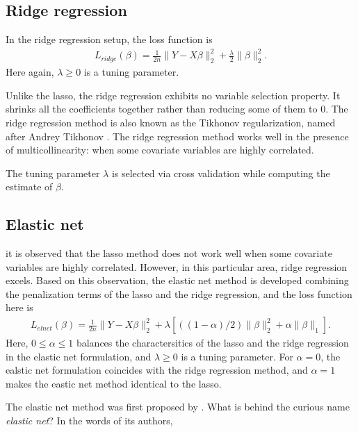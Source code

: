 \documentclass[
]{book}
\begin{document}
\hypertarget{ridge-description}{%
\subsection{Ridge regression}\label{ridge-description}}

In the ridge regression setup, the loss function is
\begin{align*}
L_{ridge}(\beta) = \frac{1}{2n} \| Y - X \beta \|^2_2 + \frac{\lambda}{2} \| \beta \|_2^2 .
\end{align*}
Here again, \(\lambda \ge 0\) is a tuning parameter.

Unlike the lasso, the ridge regression exhibits no variable selection property. It shrinks all the coefficients together rather than reducing some of them to 0. The ridge regression method is also known as the Tikhonov regularization, named after Andrey Tikhonov \citep{tikhonov1943stability}. The ridge regression method works well in the presence of multicollinearity: when some covariate variables are highly correlated.

The tuning parameter \(\lambda\) is selected via cross validation while computing the estimate of \(\beta\).

\hypertarget{elasticnet-description}{%
\subsection{Elastic net}\label{elasticnet-description}}

it is observed that the lasso method does not work well when some covariate variables are highly correlated. However, in this particular area, ridge regression excels. Based on this observation, the elastic net method is developed combining the penalization terms of the lasso and the ridge regression, and the loss function here is
\begin{align*}
L_{elnet}(\beta) = \frac{1}{2n} \| Y - X \beta \|^2_2 + \lambda \left[ ((1 - \alpha) / 2) \| \beta \|_2^2 + \alpha \| \beta \|_1 \right] .
\end{align*}
Here, \(0 \le \alpha \le 1\) balances the charactersitics of the lasso and the ridge regression in the elastic net formulation, and \(\lambda \ge 0\) is a tuning parameter. For \(\alpha = 0\), the ealstic net formulation coincides with the ridge regression method, and \(\alpha = 1\) makes the eastic net method identical to the lasso.

The elastic net method was first proposed by \citet{zou2005regularization}. What is behind the curious name \emph{elastic net}? In the words of its authors,
\end{document}
